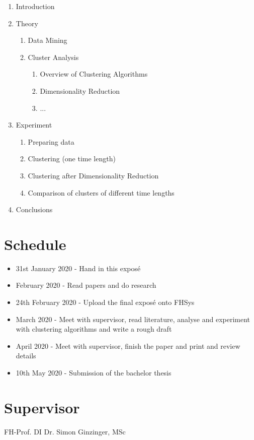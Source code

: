 \documentclass[12pt,a4paper]{article}
\begin{document}
\begin{enumerate}
	\item Introduction
	\item Theory
	\begin{enumerate}
		\item Data Mining 
		\item Cluster Analysis
		\begin{enumerate}
			\item Overview of Clustering Algorithms
			\item Dimensionality Reduction
			\item ...
		\end{enumerate}
	\end{enumerate}
	\item Experiment
	\begin{enumerate}
		\item Preparing data
		\item Clustering (one time length)
		\item Clustering after Dimensionality Reduction
		\item Comparison of clusters of different time lengths
	\end{enumerate}
	\item Conclusions
\end{enumerate}

\nocite{*}
\printbibliography

\section*{Schedule}

\begin{itemize}
	\item 31st January 2020 - Hand in this exposé
	\item February 2020 - Read papers and do research
	\item 24th February 2020 - Upload the final exposé onto FHSys
	\item March 2020 - Meet with supervisor, read literature, analyse and experiment with clustering algorithms and write a rough draft
	\item April 2020 - Meet with supervisor, finish the paper and print and review details
	\item 10th May 2020 - Submission of the bachelor thesis
\end{itemize}

\section*{Supervisor}

FH-Prof. DI Dr. Simon Ginzinger, MSc
\end{document}
